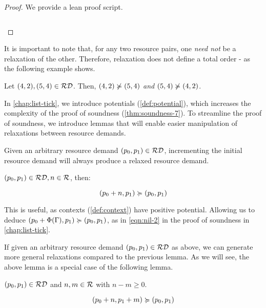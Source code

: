 \newpage

\begin{proof}
   We provide a lean proof script.
   \inputminted{lean}{formal-proofs/Resources/Relaxation_PO.lean}
\end{proof}

It is important to note that, for any two resource pairs, one \emph{need not} be a relaxation of the other. Therefore, relaxation does not define a total order - as the following example shows.

\begin{example}
   Let \((4,2), (5,4) \in \mathcal{RD}\). Then, \((4,2) \notrelaxation (5,4)\) \emph{and} \((5,4) \notrelaxation (4,2)\).
\end{example}

In \cref{chap:list-tick}, we introduce potentials (\cref{def:potential}), which increases the complexity of the proof of soundness (\cref{thm:soundness-7}). To streamline the proof of soundness, we introduce lemmas that will enable easier manipulation of relaxations between resource demands.

Given an arbitrary resource demand \((p_0, p_1) \in \mathcal{RD}\), incrementing the initial resource demand will always produce a relaxed resource demand.
\begin{lemma}
   \((p_0, p_1) \in \mathcal{RD}, n \in \mathcal{R}\), then:

   \[
      (p_0 + n, p_1) \succcurlyeq (p_0, p_1)
   \]
\end{lemma}

\begin{remark}
   This is useful, as contexts (\cref{def:context}) have positive potential. Allowing us to deduce \((p_0 + \Phi(\Gamma), p_1) \succcurlyeq (p_0, p_1)\), as in \cref{eqn:nil-2} in the proof of soundness in \cref{chap:list-tick}.
\end{remark}

If given an arbitrary resource demand \((p_0, p_1) \in \mathcal{RD}\) as above, we can generate more general relaxations compared to the previous lemma. As we will see, the above lemma is a special case of the following lemma.

\begin{lemma}\label{lemma:pos-relaxation}
   \((p_0, p_1) \in \mathcal{RD}\) and \(n, m \in \mathcal{R}\) with \(n - m \geq 0\).

   \[
      (p_0 + n, p_1 + m) \succcurlyeq (p_0, p_1)
   \]
\end{lemma}

